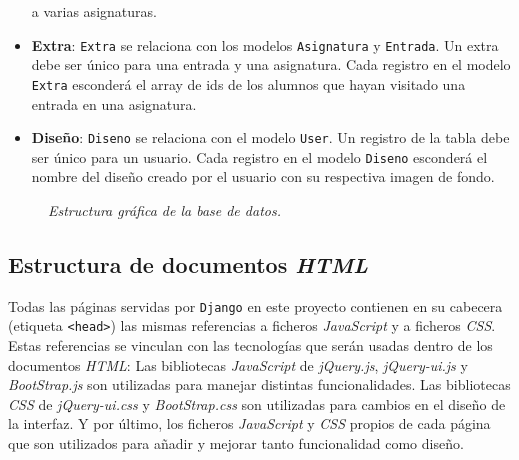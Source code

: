 \documentclass[a4paper, 12pt]{book}
\begin{document}
\begin{itemize}
  a varias asignaturas.
  \item {\bfseries Extra}: \texttt{Extra} se relaciona con los modelos \texttt{Asignatura} y \texttt{Entrada}. Un extra debe ser \'unico para una 
  entrada y una asignatura. Cada registro en el modelo \texttt{Extra} esconder\'a el array de ids de los alumnos que hayan visitado una entrada en una 
  asignatura.
  \item {\bfseries Dise\~no}: \texttt{Diseno} se relaciona con el modelo \texttt{User}. Un registro de la tabla debe ser \'unico para un usuario. 
  Cada registro en el modelo \texttt{Diseno} esconder\'a el nombre del dise\~no creado por el usuario con su respectiva imagen de fondo.
\end{itemize}


\begin{figure}
  \centering
  \caption{\textit{Estructura gr\'afica de la base de datos.}}
  \label{fig:disenobbdd}
\end{figure}


\subsection{Estructura de documentos \textit{HTML}} 
\label{sec:estructurahtml}
Todas las p\'aginas servidas por \texttt{Django} en este proyecto contienen en su cabecera (etiqueta \texttt{<head>}) las mismas referencias a ficheros 
\textit{JavaScript} y a ficheros \textit{CSS}. Estas referencias se vinculan con las tecnolog\'ias que ser\'an usadas dentro de los documentos \textit{HTML}:
Las bibliotecas \textit{JavaScript} de \textit{jQuery.js}, \textit{jQuery-ui.js} y \textit{BootStrap.js} son utilizadas para manejar distintas 
funcionalidades. Las bibliotecas \textit{CSS} de \textit{jQuery-ui.css} y \textit{BootStrap.css} son utilizadas para cambios en el dise\~no de la interfaz. 
Y por \'ultimo, los ficheros \textit{JavaScript} y \textit{CSS} propios de cada p\'agina que son utilizados para a\~nadir y mejorar tanto funcionalidad 
como dise\~no.
\end{document}
